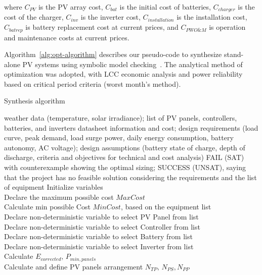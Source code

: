 \documentclass[runningheads]{llncs}
\begin{document}
\noindent where $C_{PV}$ is the PV array cost, $C_{bat}$ is the initial cost of batteries, $C_{charger}$ is the cost of the charger, $C_{inv}$ is the inverter cost, $C_{installation}$ is the installation cost, $C_{batrep}$ is battery replacement cost at current prices, and $C_{PWO\&M}$ is operation and maintenance costs at current prices.

Algorithm~\ref{alg:opt-algorithm} describes our pseudo-code to synthesize stand-alone PV systems using symbolic model checking~\cite{DBLP:journals/corr/abs-1909-13139}. The analytical method of optimization was adopted, with LCC economic analysis and power reliability based on critical period criteria (worst month's method).

 \begin{algorithm}
 \caption{Synthesis algorithm}
 \begin{algorithmic}[1]
 \renewcommand{\algorithmicrequire}{\textbf{Input:}}
 \renewcommand{\algorithmicensure}{\textbf{Output:}}
  \REQUIRE weather data (temperature, solar irradiance); list of PV panels, controllers, batteries, and inverters datasheet information and cost; design requirements (load curve, peak demand, load surge power, daily energy consumption, battery autonomy, AC voltage); design assumptions (battery state of charge, depth of discharge, criteria and objectives for technical and cost analysis)
 \ENSURE FAIL (SAT) with counterexample showing the optimal sizing; SUCCESS (UNSAT), saying that the project has no feasible solution considering the requirements and the list of equipment
  \STATE Initialize variables \\
  \STATE Declare the maximum possible cost $MaxCost$  \\
  \STATE Calculate min possible Cost $MinCost$, based on the equipment list \\
 	\STATE Declare non-deterministic variable to select PV Panel from list \\
 	\STATE Declare non-deterministic variable to select Controller from list \\
 	\STATE Declare non-deterministic variable to select Battery from list \\
 	\STATE Declare non-deterministic variable to select Inverter from list \\ 	
 	\STATE Calculate $E_{corrected}, \, P_{min,panels} $ \\
	\STATE Calculate and define PV panels arrangement $N_{TP}, \, N_{PS}, N_{PP} $ \\

\end{algorithmic}
\end{algorithm}
\end{document}
